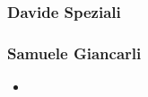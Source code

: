\subsubsection*{Davide Speziali}

\subsubsection*{Samuele Giancarli}
\begin{itemize} 
    \item 
\end{itemize}
